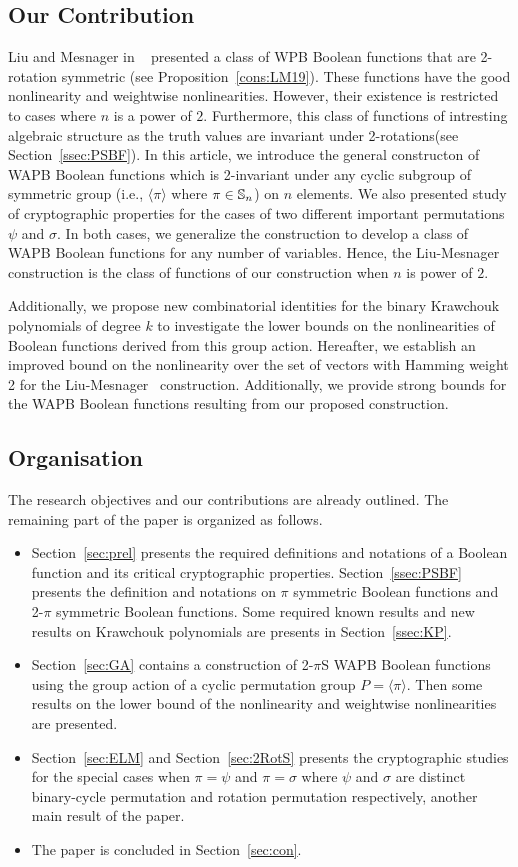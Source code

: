 \documentclass{llncs}
\begin{document}
\subsection{Our Contribution}
Liu and Mesnager in ~\cite{DCC:LiuMes19} presented a class of WPB Boolean functions that are 2-rotation symmetric (see Proposition~\ref{cons:LM19}).
These functions have the good nonlinearity and weightwise nonlinearities. However, their existence is restricted to cases where $n$ is a power of $2$. Furthermore, this class of functions of intresting algebraic structure as the truth values are invariant under 2-rotations(see Section~\ref{ssec:PSBF}).
In this article, we introduce the general constructon of WAPB Boolean functions which is 2-invariant under any cyclic subgroup of symmetric group (i.e., $\langle \pi \rangle$ where $\pi \in \mathbb{S}_n$) on $n$ elements. We also presented study of cryptographic properties for the cases of two different important permutations $\psi$ and $\sigma$. In both cases, we generalize the construction to develop a class of WAPB Boolean functions for any number of variables. Hence, the Liu-Mesnager construction is the class of functions of our construction when $n$ is power of $2$.

Additionally, we propose new combinatorial identities for the binary Krawchouk polynomials of degree $k$ to investigate the lower bounds on the nonlinearities of Boolean functions derived from this group action. 
Hereafter, we establish an improved bound on the nonlinearity over the set of vectors with Hamming weight 2 for the Liu-Mesnager~\cite{DCC:LiuMes19} construction. Additionally, we provide strong bounds for the WAPB Boolean functions resulting from our proposed construction.
\subsection{Organisation}\label{ssec:org}
The research objectives and our contributions are already outlined. The remaining part of the paper is organized as follows.
\begin{itemize}
\item Section~\ref{sec:prel} presents the required definitions and notations of a Boolean function and its critical cryptographic properties.
Section~\ref{ssec:PSBF} presents the definition and notations on $\pi$ symmetric Boolean functions and 2-$\pi$ symmetric Boolean functions.
Some required known results and new results on Krawchouk polynomials are presents in Section~\ref{ssec:KP}.
\item Section~\ref{sec:GA} contains a construction of 2-$\pi$S WAPB Boolean functions using the group action of a cyclic permutation group $P = \langle \pi \rangle$. Then some results on the lower bound of the nonlinearity and weightwise nonlinearities are presented.
\item Section~\ref{sec:ELM} and Section~\ref{sec:2RotS} presents the cryptographic studies for the special cases when $\pi = \psi$ and $\pi = \sigma$ where $\psi$ and $\sigma$ are distinct binary-cycle permutation and rotation permutation respectively,
another main result of the paper.
\item The paper is concluded in Section~\ref{sec:con}.
\end{itemize}
\end{document}
